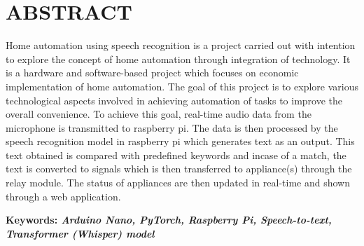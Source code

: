 
\chapter*{ABSTRACT}


Home automation using speech recognition is a project carried out with intention to explore the concept of home automation through integration of technology. It is a hardware and software-based project which focuses on economic implementation of home automation. The goal of this project is to explore various technological aspects involved in  achieving automation of tasks to improve the overall convenience. To achieve this goal, real-time audio data from the microphone is transmitted to raspberry pi. The data is then processed by the speech recognition model in raspberry pi which generates text as an output. This text obtained is compared with predefined keywords and incase of a match, the text is converted to signals which is then transferred to appliance(s) through the relay module. The status of appliances are then updated in real-time and shown through a web application.

\par
\textbf{Keywords: \textit{Arduino Nano,
PyTorch,
Raspberry Pi,
Speech-to-text,
Transformer (Whisper) model}}

